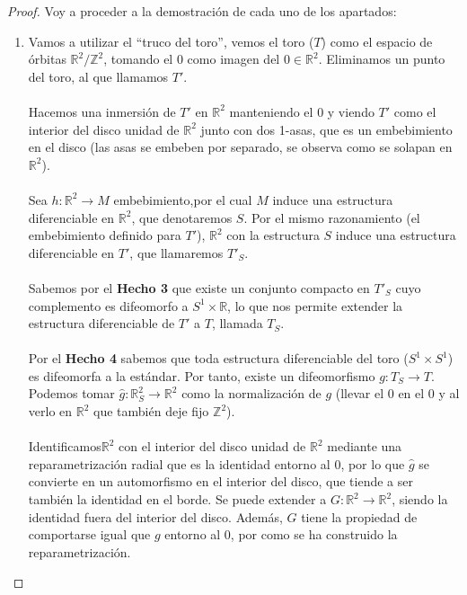	\begin{proof}
		Voy a proceder a la demostración de cada uno de los apartados: \\
		\begin{enumerate}
			\item Vamos a utilizar el ``truco del toro'', vemos el toro ($T$) como el espacio de órbitas $\mathbb{R}^2/\mathbb{Z}^2$, tomando el $0$ como imagen del $0\in \mathbb{R}^2$. Eliminamos un punto del toro, al que llamamos $T'$. \\
				\\ Hacemos una inmersión de $T'$ en $\mathbb{R}^2$ manteniendo el $0$ y viendo $T'$ como el interior del disco unidad de $\mathbb{R}^2$ junto con dos 1-asas, que es un embebimiento en el disco (las asas se embeben por separado, se observa como se solapan en $\mathbb{R}^2$).\\
				\\ Sea $h:\mathbb{R}^2 \rightarrow M$ embebimiento,por el cual $M$ induce una estructura diferenciable en $\mathbb{R}^2$, que denotaremos $S$. Por el mismo razonamiento (el embebimiento definido para $T'$), $\mathbb{R}^2$ con la estructura $S$ induce una estructura diferenciable en $T'$, que llamaremos $T'_S$.\\
				\\ Sabemos por el \textbf{Hecho 3} que existe un conjunto compacto en $T'_S$ cuyo complemento es difeomorfo a $S^1\times \mathbb{R}$, lo que nos permite extender la estructura diferenciable de $T'$ a $T$, llamada $T_S$.\\
				\\ Por el \textbf{Hecho 4} sabemos que toda estructura diferenciable del toro ($S^1\times S^1$) es difeomorfa a la estándar. Por tanto, existe un difeomorfismo $g: T_S \rightarrow T$. Podemos tomar $\widehat{g}:\mathbb{R}^2_S \rightarrow \mathbb{R}^2$ como la normalización de $g$ (llevar el $0$ en el $0$ y al verlo en $\mathbb{R}^2$ que también deje fijo $\mathbb{Z}^2$).\\
				\\ Identificamos$\mathbb{R}^2$ con el interior del disco unidad de $\mathbb{R}^2$ mediante una reparametrización radial que es la identidad entorno al $0$, por lo que  $\widehat{g}$ se convierte en un automorfismo en el interior del disco, que tiende a ser también la identidad en el borde. Se puede extender a $G:\mathbb{R}^2 \rightarrow \mathbb{R}^2$, siendo la identidad fuera del interior del disco. Además, $G$ tiene la propiedad de comportarse igual que $g$ entorno al $0$, por como se ha construido la reparametrización.\\

\end{enumerate}
\end{proof}
